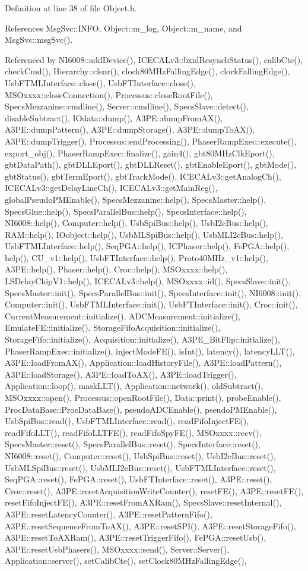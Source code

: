 Definition at line 38 of file Object.h.

References MsgSvc::INFO, Object::m\_\-log, Object::m\_\-name, and MsgSvc::msgSvc().

Referenced by NI6008::addDevice(), ICECALv3::bxidResynchStatus(), calibCte(), checkCmd(), Hierarchy::clear(), clock80MHzFallingEdge(), clockFallingEdge(), UsbFTMLInterface::close(), UsbFTInterface::close(), MSOxxxx::closeConnection(), Processus::closeRootFile(), SpecsMezzanine::cmdline(), Server::cmdline(), SpecsSlave::detect(), disableSubtract(), IOdata::dump(), A3PE::dumpFromAX(), A3PE::dumpPattern(), A3PE::dumpStorage(), A3PE::dumpToAX(), A3PE::dumpTrigger(), Processus::endProcessing(), PhaserRampExec::execute(), export\_\-obj(), PhaserRampExec::finalize(), gain4(), gbt80MHzClkEport(), gbtDataPath(), gbtDLLEport(), gbtDLLReset(), gbtEnableEport(), gbtMode(), gbtStatus(), gbtTermEport(), gbtTrackMode(), ICECALv3::getAnalogCh(), ICECALv3::getDelayLineCh(), ICECALv3::getMainReg(), globalPseudoPMEnable(), SpecsMezzanine::help(), SpecsMaster::help(), SpecsGlue::help(), SpecsParallelBus::help(), SpecsInterface::help(), NI6008::help(), Computer::help(), UsbSpiBus::help(), UsbI2cBus::help(), RAM::help(), IOobject::help(), UsbMLSpiBus::help(), UsbMLI2cBus::help(), UsbFTMLInterface::help(), SeqPGA::help(), ICPhaser::help(), FePGA::help(), help(), CU\_\-v1::help(), UsbFTInterface::help(), Proto40MHz\_\-v1::help(), A3PE::help(), Phaser::help(), Croc::help(), MSOxxxx::help(), LSDelayChipV1::help(), ICECALv3::help(), MSOxxxx::id(), SpecsSlave::init(), SpecsMaster::init(), SpecsParallelBus::init(), SpecsInterface::init(), NI6008::init(), Computer::init(), UsbFTMLInterface::init(), UsbFTInterface::init(), Croc::init(), CurrentMeasurement::initialize(), ADCMeasurement::initialize(), EmulateFE::initialize(), StorageFifoAcquisition::initialize(), StorageFifo::initialize(), Acquisition::initialize(), A3PE\_\-BitFlip::initialize(), PhaserRampExec::initialize(), injectModeFE(), isInt(), latency(), latencyLLT(), A3PE::loadFromAX(), Application::loadHistoryFile(), A3PE::loadPattern(), A3PE::loadStorage(), A3PE::loadToAX(), A3PE::loadTrigger(), Application::loop(), maskLLT(), Application::network(), oldSubtract(), MSOxxxx::open(), Processus::openRootFile(), Data::print(), probeEnable(), ProcDataBase::ProcDataBase(), pseudoADCEnable(), pseudoPMEnable(), UsbSpiBus::read(), UsbFTMLInterface::read(), readFifoInjectFE(), readFifoLLT(), readFifoLLTFE(), readFifoSpyFE(), MSOxxxx::recv(), SpecsMaster::reset(), SpecsParallelBus::reset(), SpecsInterface::reset(), NI6008::reset(), Computer::reset(), UsbSpiBus::reset(), UsbI2cBus::reset(), UsbMLSpiBus::reset(), UsbMLI2cBus::reset(), UsbFTMLInterface::reset(), SeqPGA::reset(), FePGA::reset(), UsbFTInterface::reset(), A3PE::reset(), Croc::reset(), A3PE::resetAcquisitionWriteCounter(), resetFE(), A3PE::resetFE(), resetFifoInjectFE(), A3PE::resetFromAXRam(), SpecsSlave::resetInternal(), A3PE::resetLatencyCounter(), A3PE::resetPatternFifo(), A3PE::resetSequenceFromToAX(), A3PE::resetSPI(), A3PE::resetStorageFifo(), A3PE::resetToAXRam(), A3PE::resetTriggerFifo(), FePGA::resetUsb(), A3PE::resetUsbPhasers(), MSOxxxx::send(), Server::Server(), Application::server(), setCalibCte(), setClock80MHzFallingEdge(), 